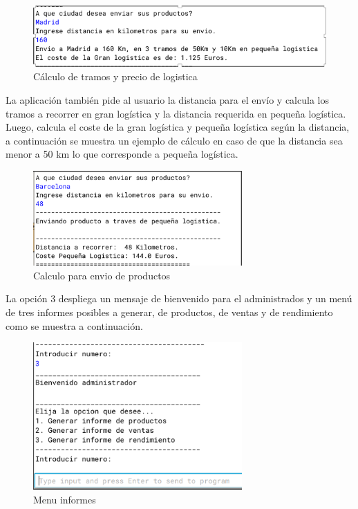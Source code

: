 \documentclass[10pt,a4paper]{article}
\begin{document}
\begin{figure}[H]
  \centerline{
  \includegraphics[width=12cm]{ciudad.png}
  }
  \captionsetup{justification=centering}
  \caption{Cálculo de tramos y precio de logistica \label{fig:opcion1MP} }
\end{figure}

La aplicación también pide al usuario la distancia para el envío y calcula los tramos a recorrer en gran logística y la distancia requerida en pequeña logística. Luego, calcula el coste de la gran logística y pequeña logística según la distancia, a continuación se muestra un ejemplo de cálculo en caso de que la distancia sea menor a 50 km lo que corresponde a pequeña logística.

\begin{figure}[H]
  \centerline{
  \includegraphics[width=8cm]{pLogistica.png}
  }
  \captionsetup{justification=centering}
  \caption{Calculo para envio de productos \label{fig:opcion1MP} }
\end{figure}



La opción 3 despliega un mensaje de bienvenido para el administrados y un menú de tres informes posibles a generar, de productos, de ventas y de rendimiento como se muestra a continuación.

\begin{figure}[H]
  \centerline{
  \includegraphics[width=8cm]{Informes.png}
  }
  \captionsetup{justification=centering}
  \caption{Menu informes \label{fig:opcion1MP} }
\end{figure}
\end{document}
